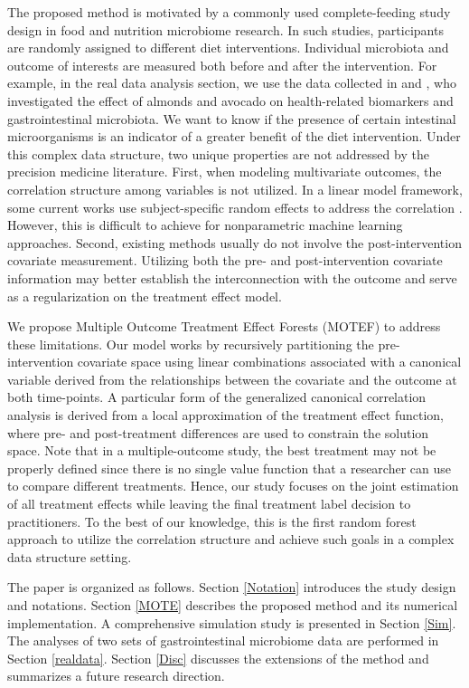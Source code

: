 \documentclass[smallextended]{svjour3}
\begin{document}
The proposed method is motivated by a commonly used complete-feeding study design in food and nutrition microbiome research. In such studies, participants are randomly assigned to different diet interventions. Individual microbiota and outcome of interests are measured both before and after the intervention. For example, in the real data analysis section, we use the data collected in \citep{holscher2018almond} and \citep{Avocado}, who investigated the effect of almonds and avocado on health-related biomarkers and gastrointestinal microbiota. We want to know if the presence of certain intestinal microorganisms is an indicator of a greater benefit of the diet intervention. Under this complex data structure, two unique properties are not addressed by the precision medicine literature. First, when modeling multivariate outcomes, the correlation structure among variables is not utilized. In a linear model framework, some current works use subject-specific random effects to address the correlation \citep{zhu2016individualizing}. However, this is difficult to achieve for nonparametric machine learning approaches. Second, existing methods usually do not involve the post-intervention covariate measurement. Utilizing both the pre- and post-intervention covariate information may better establish the interconnection with the outcome and serve as a regularization on the treatment effect model. 

We propose Multiple Outcome Treatment Effect Forests (MOTEF) to address these limitations. Our model works by recursively partitioning the pre-intervention covariate space using linear combinations associated with a canonical variable derived from the relationships between the covariate and the outcome at both time-points. A particular form of the generalized canonical correlation analysis is derived from a local approximation of the treatment effect function, where pre- and post-treatment differences are used to constrain the solution space. Note that in a multiple-outcome study, the best treatment may not be properly defined since there is no single value function \citep{qian2011performance} that a researcher can use to compare different treatments. Hence, our study focuses on the joint estimation of all treatment effects while leaving the final treatment label decision to practitioners. To the best of our knowledge, this is the first random forest approach to utilize the correlation structure and achieve such goals in a complex data structure setting. 

The paper is organized as follows. Section \ref{Notation} introduces the study design and notations. Section \ref{MOTE} describes the proposed method and its numerical implementation. A comprehensive simulation study is presented in Section \ref{Sim}. The analyses of two sets of gastrointestinal microbiome data are performed in Section \ref{realdata}. Section \ref{Disc} discusses the extensions of the method and summarizes a future research direction.
\end{document}
